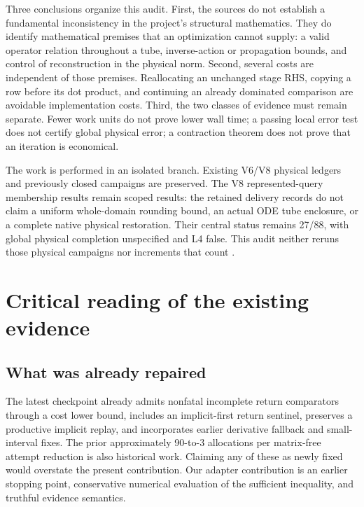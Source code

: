 \documentclass[aps,prd,reprint,amsmath,amssymb,longbibliography,nofootinbib]{revtex4-2}
\begin{document}
Three conclusions organize this audit. First, the sources do not establish a fundamental inconsistency in the project's structural mathematics. They do identify mathematical premises that an optimization cannot supply: a valid operator relation throughout a tube, inverse-action or propagation bounds, and control of reconstruction in the physical norm. Second, several costs are independent of those premises. Reallocating an unchanged stage RHS, copying a row before its dot product, and continuing an already dominated comparison are avoidable implementation costs. Third, the two classes of evidence must remain separate. Fewer work units do not prove lower wall time; a passing local error test does not certify global physical error; a contraction theorem does not prove that an iteration is economical.



The work is performed in an isolated branch. Existing V6/V8 physical ledgers and previously closed campaigns are preserved. The V8 represented-query membership results remain scoped results: the retained delivery records do not claim a uniform whole-domain rounding bound, an actual ODE tube enclosure, or a complete native physical restoration. Their central status remains 27/88, with global physical completion unspecified and L4 false. This audit neither reruns those physical campaigns nor increments that count \cite{V8Membership,V8Tube}.

\section{Critical reading of the existing evidence}
\label{sec:audit}
\subsection{What was already repaired}
The latest checkpoint already admits nonfatal incomplete return comparators through a cost lower bound, includes an implicit-first return sentinel, preserves a productive implicit replay, and incorporates earlier derivative fallback and small-interval fixes. The prior approximately 90-to-3 allocations per matrix-free attempt reduction is also historical work. Claiming any of these as newly fixed would overstate the present contribution. Our adapter contribution is an earlier stopping point, conservative numerical evaluation of the sufficient inequality, and truthful evidence semantics.
\end{document}
